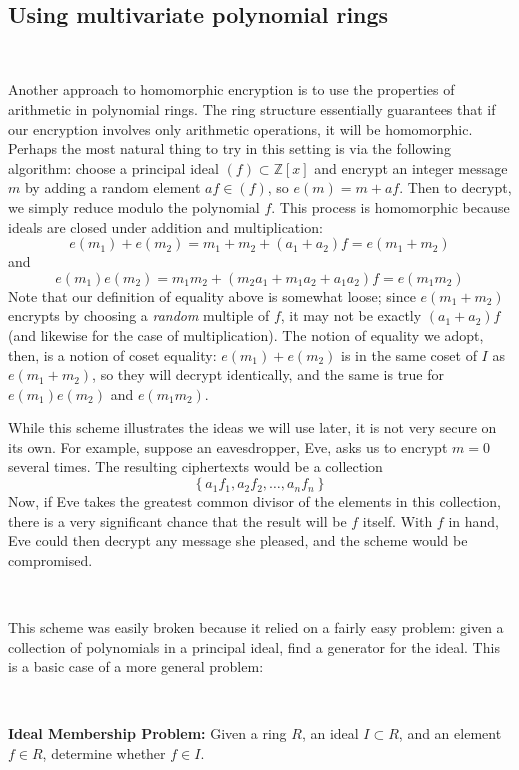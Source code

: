 \documentclass[11pt]{report}
\newcommand{\Zx}{\mathbb{Z}[x]}
\begin{document}
\

\subsection{Using multivariate polynomial rings}

\

Another approach to homomorphic encryption is to use the properties of arithmetic in polynomial rings. The ring structure essentially guarantees that if our encryption involves only arithmetic operations, it will be homomorphic. Perhaps the most natural thing to try in this setting is via the following algorithm: choose a principal ideal $(f)\subset \Zx$ and encrypt an integer message $m$ by adding a random element $af\in (f)$, so $e(m) = m+af$. Then to decrypt, we simply reduce modulo the polynomial $f$. This process is homomorphic because ideals are closed under addition and multiplication: \[e(m_1)+e(m_2) = m_1+m_2+(a_1+a_2)f= e(m_1+m_2)\] and \[e(m_1)e(m_2) = m_1m_2+(m_2a_1+m_1a_2+a_1a_2)f = e(m_1m_2)\] Note that our definition of equality above is somewhat loose; since $e(m_1+m_2)$ encrypts by choosing a \emph{random} multiple of $f$, it may not be exactly $(a_1+a_2)f$ (and likewise for the case of multiplication). The notion of equality we adopt, then, is a notion of coset equality: $e(m_1)+e(m_2)$ is in the same coset of $I$ as $e(m_1+m_2)$, so they will decrypt identically, and the same is true for $e(m_1)e(m_2)$ and $e(m_1m_2)$.

While this scheme illustrates the ideas we will use later, it is not very secure on its own. For example, suppose an eavesdropper, Eve, asks us to encrypt $m=0$ several times. The resulting ciphertexts would be a collection \[\left\{ a_1f_1, a_2f_2,\dots ,a_nf_n\right\}\] Now, if Eve takes the greatest common divisor of the elements in this collection, there is a very significant chance that the result will be $f$ itself. With $f$ in hand, Eve could then decrypt any message she pleased, and the scheme would be compromised.

\

This scheme was easily broken because it relied on a fairly easy problem: given a collection of polynomials in a principal ideal, find a generator for the ideal. This is a basic case of a more general problem:

\

\textbf{Ideal Membership Problem:} Given a ring $R$, an ideal $I\subset R$, and an element $f\in R$, determine whether $f\in I$.
\end{document}
